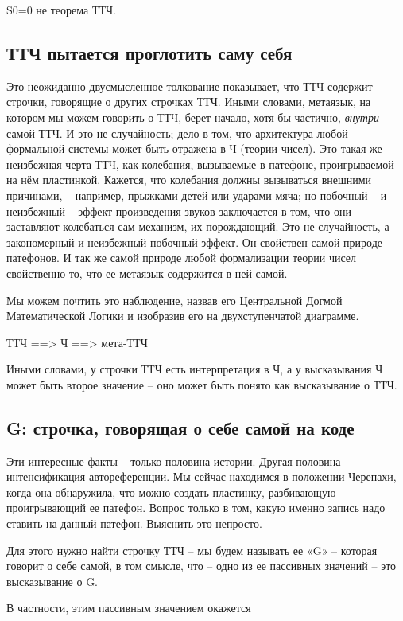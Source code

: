\documentclass[../main.tex]{subfiles}
\begin{document}
S0=0 не теорема ТТЧ.


\subsection{ТТЧ пытается проглотить саму себя}

Это неожиданно двусмысленное толкование показывает, что ТТЧ содержит строчки, говорящие о других строчках ТТЧ\@. Иными словами, метаязык, на котором мы можем говорить о ТТЧ, берет начало, хотя бы частично, \emph{внутри} самой ТТЧ\@. И это не случайность; дело в том, что архитектура любой формальной системы может быть отражена в Ч (теории чисел). Это такая же неизбежная черта ТТЧ, как колебания, вызываемые в патефоне, проигрываемой на нём пластинкой. Кажется, что колебания должны вызываться внешними причинами, \--- например, прыжками детей или ударами мяча; но побочный \--- и неизбежный \--- эффект произведения звуков заключается в том, что они заставляют колебаться сам механизм, их порождающий. Это не случайность, а закономерный и неизбежный побочный эффект. Он свойствен самой природе патефонов. И так же самой природе любой формализации теории чисел свойственно то, что ее метаязык содержится в ней самой.

Мы можем почтить это наблюдение, назвав его Центральной Догмой Математической Логики и изобразив его на двухступенчатой диаграмме.

ТТЧ ==\textgreater{} Ч ==\textgreater{} мета-ТТЧ

Иными словами, у строчки ТТЧ есть интерпретация в Ч, а у высказывания Ч может быть второе значение \--- оно может быть понято как высказывание о ТТЧ.


\subsection{G: строчка, говорящая о себе самой на коде}

Эти интересные факты \--- только половина истории. Другая половина \--- интенсификация автореференции. Мы сейчас находимся в положении Черепахи, когда она обнаружила, что можно создать пластинку, разбивающую проигрывающий ее патефон. Вопрос только в том, какую именно запись надо ставить на данный патефон. Выяснить это непросто.

Для этого нужно найти строчку ТТЧ \--- мы будем называть ее «G» \--- которая говорит о себе самой, в том смысле, что \--- одно из ее пассивных значений \--- это высказывание о G.

В частности, этим пассивным значением окажется
\end{document}
